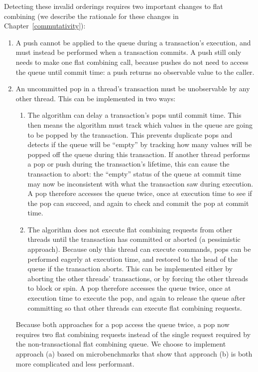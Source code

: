 Detecting these invalid orderings requires two important changes to flat combining (we describe the rationale for these changes in Chapter~\ref{commutativity}): 
\begin{enumerate}
    \item A push cannot be applied to the queue during a transaction's execution, and must instead be performed when a transaction commits. A push still only needs to make one flat combining call, because pushes do not need to access the queue until commit time: a push returns no observable value to the caller.
\item An uncommitted pop in a thread's transaction must be unobservable by any other thread. This can be implemented in two ways:  
    \begin{enumerate}
        \item The algorithm can delay a transaction's pops until commit time. This then means the algorithm must track which values in the queue are going to be popped by the transaction. This prevents duplicate pops and detects if the queue will be ``empty'' by tracking how many values will be popped off the queue during this transaction. If another thread performs a pop or push during the transaction's lifetime, this can cause the transaction to abort: the ``empty'' status of the queue at commit time may now be inconsistent with what the transaction saw during execution. 
        A pop therefore accesses the queue twice, once at execution time to see if the pop can succeed, and again to check and commit the pop at commit time. 
        \item The algorithm does not execute flat combining requests from other threads until the transaction has committed or aborted (a pessimistic approach). Because only this thread can execute commands, pops can be performed eagerly at execution time, and restored to the head of the queue if the transaction aborts. This can be implemented either by aborting the other threads' transactions, or by forcing the other threads to block or spin.
        A pop therefore accesses the queue twice, once at execution time to execute the pop, and again to release the queue after committing so that other threads can execute flat combining requests.
    \end{enumerate}

        Because both approaches for a pop access the queue twice, a pop now requires two flat combining requests instead of the single request required by the non-transactional flat combining queue.
        We choose to implement approach (a) based on microbenchmarks that show that approach (b) is both more complicated and less performant.

\end{enumerate}

